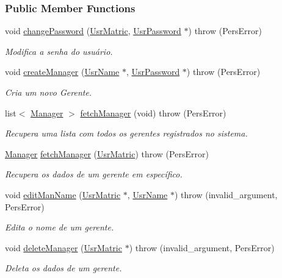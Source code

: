 \subsubsection*{Public Member Functions}
\begin{DoxyCompactItemize}
\item 
void \hyperlink{classStubUserManAdm_ab1f051d16d9284a2f7a5869afb85cd1a}{change\-Password} (\hyperlink{classUsrMatric}{Usr\-Matric}, \hyperlink{classUsrPassword}{Usr\-Password} $\ast$)  throw (\-Pers\-Error)
\begin{DoxyCompactList}\small\item\em Modifica a senha do usuário. \end{DoxyCompactList}\item 
void \hyperlink{classStubUserManAdm_ac833e3729b1adf46edf78376719acde5}{create\-Manager} (\hyperlink{classUsrName}{Usr\-Name} $\ast$, \hyperlink{classUsrPassword}{Usr\-Password} $\ast$)  throw (\-Pers\-Error)
\begin{DoxyCompactList}\small\item\em Cria um novo Gerente. \end{DoxyCompactList}\item 
list$<$ \hyperlink{classManager}{Manager} $>$ \hyperlink{classStubUserManAdm_a5aa1a8d94912f9971f17bcd8a52dfa7c}{fetch\-Manager} (void)  throw (\-Pers\-Error)
\begin{DoxyCompactList}\small\item\em Recupera uma lista com todos os gerentes registrados no sistema. \end{DoxyCompactList}\item 
\hyperlink{classManager}{Manager} \hyperlink{classStubUserManAdm_a66bdd469d275154728c929e0581aaa71}{fetch\-Manager} (\hyperlink{classUsrMatric}{Usr\-Matric})  throw (\-Pers\-Error)
\begin{DoxyCompactList}\small\item\em Recupera os dados de um gerente em específico. \end{DoxyCompactList}\item 
void \hyperlink{classStubUserManAdm_ac1da713638e441434c8ec426be495a0b}{edit\-Man\-Name} (\hyperlink{classUsrMatric}{Usr\-Matric} $\ast$, \hyperlink{classUsrName}{Usr\-Name} $\ast$)  throw (invalid\-\_\-argument, Pers\-Error)
\begin{DoxyCompactList}\small\item\em Edita o nome de um gerente. \end{DoxyCompactList}\item 
void \hyperlink{classStubUserManAdm_a45f93196f3de7a92ebd0688007b47e5f}{delete\-Manager} (\hyperlink{classUsrMatric}{Usr\-Matric} $\ast$)  throw (invalid\-\_\-argument, Pers\-Error)
\begin{DoxyCompactList}\small\item\em Deleta os dados de um gerente. \end{DoxyCompactList}\end{DoxyCompactItemize}


